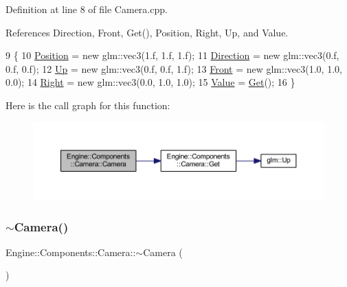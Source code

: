 Definition at line 8 of file Camera.\+cpp.



References Direction, Front, Get(), Position, Right, Up, and Value.


\begin{DoxyCode}
9 \{
10     \mbox{\hyperlink{classEngine_1_1Components_1_1Camera_ab2c3ed9a1321a95db8fca95bc7f4b290}{Position}} = \textcolor{keyword}{new} glm::vec3(1.f, 1.f, 1.f);
11     \mbox{\hyperlink{classEngine_1_1Components_1_1Camera_a23619a66046258f1158313f0c790ffa2}{Direction}} = \textcolor{keyword}{new} glm::vec3(0.f, 0.f, 0.f);
12     \mbox{\hyperlink{classEngine_1_1Components_1_1Camera_a84a4199b9c60579a0f148b9980e05200}{Up}} = \textcolor{keyword}{new} glm::vec3(0.f, 0.f, 1.f);
13     \mbox{\hyperlink{classEngine_1_1Components_1_1Camera_a9d8692aa379c9ab00f69df10d1d3651b}{Front}} = \textcolor{keyword}{new} glm::vec3(1.0, 1.0, 0.0);
14     \mbox{\hyperlink{classEngine_1_1Components_1_1Camera_a10b30289c89694d13918a979bade13d9}{Right}} = \textcolor{keyword}{new} glm::vec3(0.0, 1.0, 1.0);
15     \mbox{\hyperlink{classEngine_1_1Components_1_1Camera_a5d131a78545d9f70496549946503b27a}{Value}} = \mbox{\hyperlink{classEngine_1_1Components_1_1Camera_ad24b41321813d1757cb6dd0db52e34dd}{Get}}();
16 \}
\end{DoxyCode}
Here is the call graph for this function\+:
\nopagebreak
\begin{figure}[H]
\begin{center}
\leavevmode
\includegraphics[width=350pt]{classEngine_1_1Components_1_1Camera_ae8ad7f42b61412322436eadfa5261d5e_cgraph}
\end{center}
\end{figure}
\mbox{\label{classEngine_1_1Components_1_1Camera_ac040fa629766d0b0deefa6412f004fad}} 
\subsubsection{\texorpdfstring{$\sim$\+Camera()}{~Camera()}}
{\footnotesize\ttfamily Engine\+::\+Components\+::\+Camera\+::$\sim$\+Camera (\begin{DoxyParamCaption}{ }\end{DoxyParamCaption})}



